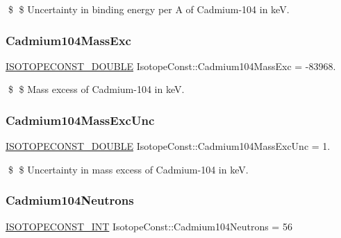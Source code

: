 \$ \$ Uncertainty in binding energy per A of Cadmium-\/104 in keV. \mbox{\label{group___isotope_const-_cadmium-_cd104_ga137c6345a8a4d16707bd29d9aa292a5f}} 
\subsubsection{\texorpdfstring{Cadmium104\+Mass\+Exc}{Cadmium104MassExc}}
{\footnotesize\ttfamily \mbox{\hyperlink{group___isotope_const-_macros_ga8f45a7272ce02c0b4c65c44636ed719a}{I\+S\+O\+T\+O\+P\+E\+C\+O\+N\+S\+T\+\_\+\+D\+O\+U\+B\+LE}} Isotope\+Const\+::\+Cadmium104\+Mass\+Exc = -\/83968.}

\$ \$ Mass excess of Cadmium-\/104 in keV. \mbox{\label{group___isotope_const-_cadmium-_cd104_ga449295925e4d21ca04f8814a890bc68e}} 
\subsubsection{\texorpdfstring{Cadmium104\+Mass\+Exc\+Unc}{Cadmium104MassExcUnc}}
{\footnotesize\ttfamily \mbox{\hyperlink{group___isotope_const-_macros_ga8f45a7272ce02c0b4c65c44636ed719a}{I\+S\+O\+T\+O\+P\+E\+C\+O\+N\+S\+T\+\_\+\+D\+O\+U\+B\+LE}} Isotope\+Const\+::\+Cadmium104\+Mass\+Exc\+Unc = 1.}

\$ \$ Uncertainty in mass excess of Cadmium-\/104 in keV. \mbox{\label{group___isotope_const-_cadmium-_cd104_ga0d98c6099de840109acdf2c2f9402ce1}} 
\subsubsection{\texorpdfstring{Cadmium104\+Neutrons}{Cadmium104Neutrons}}
{\footnotesize\ttfamily \mbox{\hyperlink{group___isotope_const-_macros_ga5f18360b3e99483a35c32d789e62621c}{I\+S\+O\+T\+O\+P\+E\+C\+O\+N\+S\+T\+\_\+\+I\+NT}} Isotope\+Const\+::\+Cadmium104\+Neutrons = 56}

